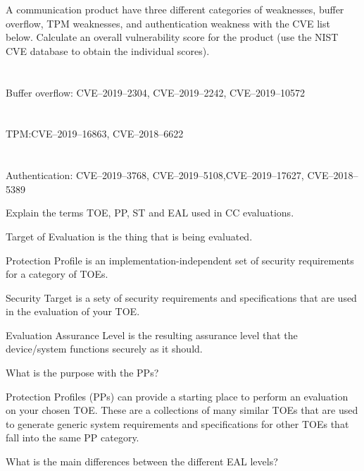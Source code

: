 \begin{questions}
\question{} A communication product have three different categories of weaknesses, buffer overflow, TPM weaknesses, and authentication weakness with the CVE list below. Calculate an overall vulnerability score for the product (use the NIST CVE database to obtain the individual scores).
  \begin{parts}
  \part{} Buffer overflow: CVE--2019--2304, CVE--2019--2242, CVE--2019--10572
  \part{} TPM:\@ CVE--2019--16863, CVE--2018--6622
  \part{} Authentication: CVE--2019--3768, CVE--2019--5108,CVE--2019--17627, CVE--2018--5389
  \end{parts}

\question{} Explain the terms TOE, PP, ST and EAL used in CC evaluations.
  \begin{solution}
    \begin{description}[noitemsep]
    \item[TOE] Target of Evaluation is the thing that is being evaluated.
    \item[PP] Protection Profile is an implementation-independent set of security requirements for a category of TOEs.
    \item[ST] Security Target is a sety of security requirements and specifications that are used in the evaluation of your TOE.\@
    \item[EAL] Evaluation Assurance Level is the resulting assurance level that the device/system functions securely as it should.
    \end{description}
  \end{solution}

\question{} What is the purpose with the PPs?
  \begin{solution}
    Protection Profiles (PPs) can provide a starting place to perform an evaluation on your chosen TOE.\@
    These are a collections of many similar TOEs that are used to generate generic system requirements and specifications for other TOEs that fall into the same PP category.
  \end{solution}

\question{} What is the main differences between the different EAL levels?
\end{questions}


